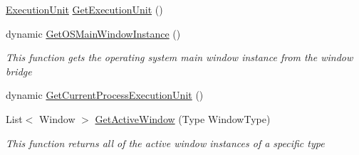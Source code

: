 \begin{DoxyCompactItemize}
\hyperlink{class_c_p_u___o_s___simulator_1_1_c_p_u_1_1_execution_unit}{Execution\+Unit} \hyperlink{class_c_p_u___o_s___simulator_1_1_c_p_u_1_1_instruction_a3a7fddcb23397c37639db3a7bab580f1}{Get\+Execution\+Unit} ()
\item 
dynamic \hyperlink{class_c_p_u___o_s___simulator_1_1_c_p_u_1_1_instruction_a037f3fea306b35463734b20254033c66}{Get\+O\+S\+Main\+Window\+Instance} ()
\begin{DoxyCompactList}\small\item\em This function gets the operating system main window instance from the window bridge \end{DoxyCompactList}\item 
dynamic \hyperlink{class_c_p_u___o_s___simulator_1_1_c_p_u_1_1_instruction_a91612f80419e5cb3614f1c0679ea7bf5}{Get\+Current\+Process\+Execution\+Unit} ()
\item 
List$<$ Window $>$ \hyperlink{class_c_p_u___o_s___simulator_1_1_c_p_u_1_1_instruction_a0db56b05531624fbe8d0075f4318cb50}{Get\+Active\+Window} (Type Window\+Type)
\begin{DoxyCompactList}\small\item\em This function returns all of the active window instances of a specific type \end{DoxyCompactList}\end{DoxyCompactItemize}
